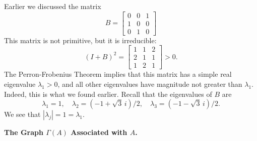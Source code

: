 \begin{xexample}
Earlier we discussed the matrix
\begin{equation}
   B = \begin{bmatrix}
             0 & 0 & 1 \\ 1 & 0 & 0 \\ 0 & 1 & 0
       \end{bmatrix}
\end{equation}
This matrix is not primitive, but it is irreducible:
\begin{equation}
  (I+B)^2 = \begin{bmatrix}
                1 & 1 & 2 \\ 2 & 1 & 1 \\ 1 & 2 & 1
            \end{bmatrix}
          > 0.
\end{equation}
The Perron-Frobenius Theorem implies that this matrix
has a simple real eigenvalue $\lambda_1 >0$, and all
other eigenvalues have magnitude not greater than $\lambda_1$.
Indeed, this is what we found earlier.
Recall that
the eigenvalues of $B$ are
\begin{equation}
  \lambda_1 = 1, \quad
  \lambda_2 =  (-1+\sqrt{3}\,i)/2, \quad
  \lambda_3 =  (-1-\sqrt{3}\,i)/2.
\end{equation}
We see that $|\lambda_j| = 1 = \lambda_1$.
\end{xexample}

\medskip
\noindent
\textbf{The Graph $\Gamma(A)$ Associated with $A$.}

